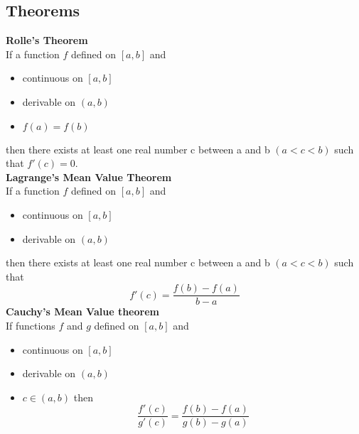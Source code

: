 \documentclass[12pt]{article}
\begin{document}
\subsection{Theorems}
\textbf{Rolle's Theorem}\\
If a function $f$ defined on $[a,b]$ and
\begin{itemize} 
\item  continuous on $[a,b]$
\item derivable on $(a,b)$ 
\item $f(a)=f(b)$
\end{itemize}
then there exists at least one real number c between a and b $(a<c<b)$
such that $f'(c)=0.$ \\
\textbf{Lagrange's Mean Value Theorem } \\
If a function $f$ defined on $[a,b]$ and
\begin{itemize} 
\item  continuous on $[a,b]$
\item derivable on $(a,b)$
\end{itemize}
then there exists at least one real number c between a and b $(a<c<b)$
such that $$f'(c)=\frac{f(b)-f(a)}{b-a} $$
\textbf{Cauchy's Mean Value theorem}\\
If functions $f$  and $g$ defined on $[a,b]$ and
\begin{itemize} 
\item  continuous on $[a,b]$
\item derivable on $(a,b)$
\item $c \in (a,b)$ then
$$\frac{f'(c)}{g'(c)}=\frac{f(b)-f(a)}{g(b)-g(a)}$$
\end{itemize}
\end{document}
